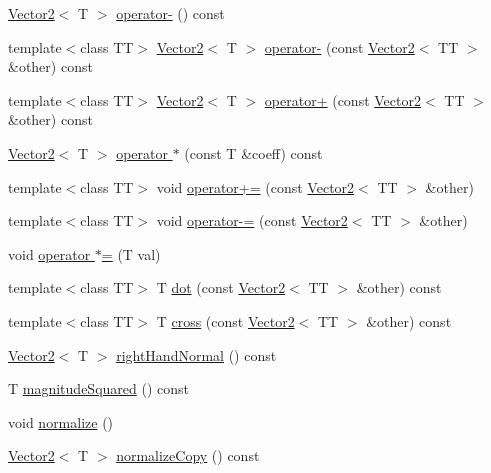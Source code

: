 \begin{CompactItemize}
\hyperlink{class_j_g_t_l_1_1_vector2}{Vector2}$<$ T $>$ \hyperlink{class_j_g_t_l_1_1_vector2_8be4baded91bfd4d18d26cc4b059b5ec}{operator-} () const
\item 
template$<$class TT$>$ \hyperlink{class_j_g_t_l_1_1_vector2}{Vector2}$<$ T $>$ \hyperlink{class_j_g_t_l_1_1_vector2_536c37983214090d2b35a1bcbb98e564}{operator-} (const \hyperlink{class_j_g_t_l_1_1_vector2}{Vector2}$<$ TT $>$ \&other) const 
\item 
template$<$class TT$>$ \hyperlink{class_j_g_t_l_1_1_vector2}{Vector2}$<$ T $>$ \hyperlink{class_j_g_t_l_1_1_vector2_6b48947227fbaad4190ea6240ff47400}{operator+} (const \hyperlink{class_j_g_t_l_1_1_vector2}{Vector2}$<$ TT $>$ \&other) const 
\item 
\hyperlink{class_j_g_t_l_1_1_vector2}{Vector2}$<$ T $>$ \hyperlink{class_j_g_t_l_1_1_vector2_5eed9682c853d7b3770bd2f242a44692}{operator $\ast$} (const T \&coeff) const 
\item 
template$<$class TT$>$ void \hyperlink{class_j_g_t_l_1_1_vector2_694ca020b236266ce8e2f1cdb5717b8f}{operator+=} (const \hyperlink{class_j_g_t_l_1_1_vector2}{Vector2}$<$ TT $>$ \&other)
\item 
template$<$class TT$>$ void \hyperlink{class_j_g_t_l_1_1_vector2_2b228e4d945935697bfed2338c107647}{operator-=} (const \hyperlink{class_j_g_t_l_1_1_vector2}{Vector2}$<$ TT $>$ \&other)
\item 
void \hyperlink{class_j_g_t_l_1_1_vector2_67dbd8445f9f2a20b987fd0e9321d712}{operator $\ast$=} (T val)
\item 
template$<$class TT$>$ T \hyperlink{class_j_g_t_l_1_1_vector2_7da1f1c271b82459db66308d1b7357f8}{dot} (const \hyperlink{class_j_g_t_l_1_1_vector2}{Vector2}$<$ TT $>$ \&other) const 
\item 
template$<$class TT$>$ T \hyperlink{class_j_g_t_l_1_1_vector2_833c8e2a0ce884794fa7eaf3f163428b}{cross} (const \hyperlink{class_j_g_t_l_1_1_vector2}{Vector2}$<$ TT $>$ \&other) const 
\item 
\hyperlink{class_j_g_t_l_1_1_vector2}{Vector2}$<$ T $>$ \hyperlink{class_j_g_t_l_1_1_vector2_912a0b6ebadfb974d944cb7cdb9d9c47}{right\-Hand\-Normal} () const
\item 
T \hyperlink{class_j_g_t_l_1_1_vector2_6ae70676b52a3c036872898b84c68e22}{magnitude\-Squared} () const
\item 
void \hyperlink{class_j_g_t_l_1_1_vector2_6385bd9674fbada72574124565348530}{normalize} ()
\item 
\hyperlink{class_j_g_t_l_1_1_vector2}{Vector2}$<$ T $>$ \hyperlink{class_j_g_t_l_1_1_vector2_2b0888b62a1dc291f55f37a83c4e282b}{normalize\-Copy} () const

\end{CompactItemize}
